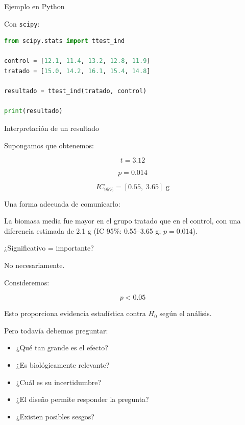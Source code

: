 \documentclass[aspectratio=169,11pt]{beamer}
\begin{document}
\begin{frame}[fragile]{Ejemplo en Python}

Con \texttt{scipy}:

\begin{lstlisting}[language=Python]
from scipy.stats import ttest_ind

control = [12.1, 11.4, 13.2, 12.8, 11.9]
tratado = [15.0, 14.2, 16.1, 15.4, 14.8]

resultado = ttest_ind(tratado, control)

print(resultado)
\end{lstlisting}

\end{frame}

\begin{frame}{Interpretación de un resultado}

Supongamos que obtenemos:

\[
t=3.12
\]

\[
p=0.014
\]

\[
IC_{95\%}=[0.55,\;3.65]\text{ g}
\]

Una forma adecuada de comunicarlo:

\begin{block}
La biomasa media fue mayor en el grupo tratado que en el control,
con una diferencia estimada de 2.1 g (IC 95\%: 0.55--3.65 g;
$p=0.014$).
\end{block}

\end{frame}

\begin{frame}{¿Significativo = importante?}

No necesariamente.

Consideremos:

\[
p<0.05
\]

Esto proporciona evidencia estadística contra $H_0$ según el análisis.

Pero todavía debemos preguntar:

\begin{itemize}
    \item ¿Qué tan grande es el efecto?
    \item ¿Es biológicamente relevante?
    \item ¿Cuál es su incertidumbre?
    \item ¿El diseño permite responder la pregunta?
    \item ¿Existen posibles sesgos?
\end{itemize}

\end{frame}
\end{document}
